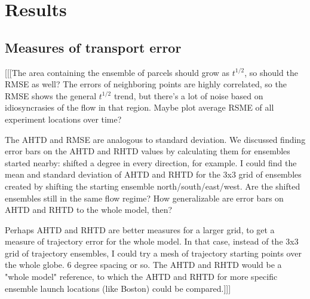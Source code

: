\chapter{Results}

\section{Measures of transport error}
[[[The area containing the ensemble of parcels should grow as $t^{1/2}$, so should the RMSE as well? 
The errors of neighboring points are highly correlated, so the RMSE shows the general $t^{1/2}$ trend, but there's a lot of noise based on idiosyncrasies of the flow in that region. 
Maybe plot average RSME of all experiment locations over time?

The AHTD and RMSE are analogous to standard deviation.
We discussed finding error bars on the AHTD and RHTD values by calculating them for ensembles started nearby: 
shifted a degree in every direction, for example. 
I could find the mean and standard deviation of AHTD and RHTD for the 3x3 grid of ensembles created by shifting the starting ensemble north/south/east/west.
Are the shifted ensembles still in the same flow regime? How generalizable are error bars on AHTD and RHTD to the whole model, then?

Perhaps AHTD and RHTD are better measures for a larger grid, to get a measure of trajectory error for the whole model. 
In that case, instead of the 3x3 grid of trajectory ensembles, I could try a mesh of trajectory starting points over the whole globe.
6 degree spacing or so. 
The AHTD and RHTD would be a "whole model" reference, to which the AHTD and RHTD for more specific ensemble launch locations (like Boston) could be compared.]]]

